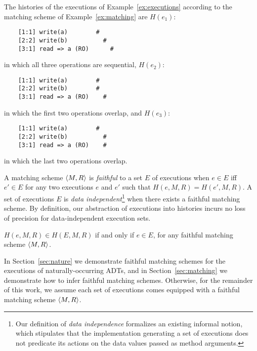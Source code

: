 \begin{example}
  \label{ex:histories-of-executions}

  The histories of the executions of Example~\ref{ex:executions} according to
  the matching scheme of Example~\ref{ex:matching} are $H(e_1)$:
\begin{verbatim}
    [1:1] write(a)        #
    [2:2] write(b)          #
    [3:1] read => a (RO)      #
\end{verbatim}
  in which all three operations are sequential, $H(e_2)$:
\begin{verbatim}
    [1:1] write(a)        #
    [2:2] write(b)        #
    [3:1] read => a (RO)    #
\end{verbatim}
  in which the first two operations overlap, and $H(e_3)$:
\begin{verbatim}
    [1:1] write(a)        #
    [2:2] write(b)          #
    [3:1] read => a (RO)    #
\end{verbatim}
  in which the last two operations overlap.

\end{example}

A matching scheme ${\left\langle{M,R}\right\rangle}$ is \emph{faithful} to a set $E$ of executions
when $e \in E$ if{f} $e' \in E$ for any two executions $e$ and $e'$ such that
$H(e,M,R) = H(e',M,R)$. A set of executions $E$ is \emph{data
independent}\footnote{Our definition of \emph{data independence} formalizes an
existing informal notion, which stipulates that the implementation generating a
set of executions does not predicate its actions on the data values passed as
method arguments.} when there exists a faithful matching scheme. By definition,
our abstraction of executions into histories incurs no loss of precision for
data-independent execution sets.

\begin{lemma}

  $H(e,M,R) \in H(E,M,R)$ if and only if $e \in E$, for any faithful matching
  scheme ${\left\langle{M,R}\right\rangle}$.

\end{lemma}

In Section~\ref{sec:nature} we demonstrate faithful matching schemes for the
executions of naturally-occurring ADTs, and in Section~\ref{sec:matching} we
demonstrate how to infer faithful matching schemes. Otherwise, for the
remainder of this work, we assume each set of executions comes equipped with a
faithful matching scheme ${\left\langle{M,R}\right\rangle}$.

